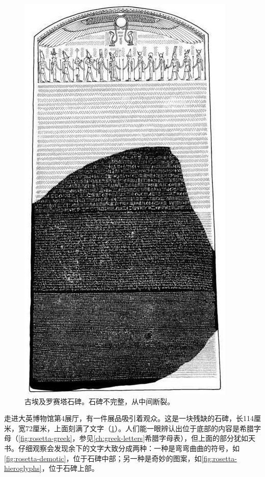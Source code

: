 \documentclass[b5paper]{ctexart}
\begin{document}
\begin{figure}[htbp]
 \centering
 \includegraphics[scale=1.0]{img/Rosetta-stone-recons}
 \caption{古埃及罗赛塔石碑。石碑不完整，从中间断裂。}
 \label{fig:rosetta-stone-recons}
\end{figure}

走进大英博物馆第4展厅，有一件展品吸引着观众。这是一块残缺的石碑，长114厘米，宽72厘米，上面刻满了文字（\cref{fig:rosetta-stone-recons}）。人们能一眼辨认出位于底部的内容是希腊字母（\cref{fig:rosetta-greek}，参见\cref{ch:greek-letters}希腊字母表），但上面的部分犹如天书。仔细观察会发现余下的文字大致分成两种：一种是弯弯曲曲的符号，如\cref{fig:rosetta-demotic}，位于石碑中部；另一种是奇妙的图案，如\cref{fig:rosetta-hieroglyphs}，位于石碑上部。
\end{document}
